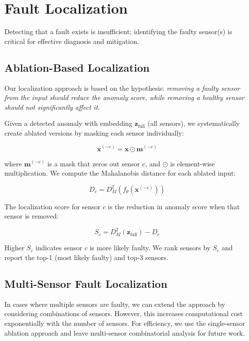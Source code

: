 \section{Fault Localization}

Detecting that a fault exists is insufficient; identifying the faulty sensor(s) is critical for effective diagnosis and mitigation.

\subsection{Ablation-Based Localization}

Our localization approach is based on the hypothesis: \textit{removing a faulty sensor from the input should reduce the anomaly score, while removing a healthy sensor should not significantly affect it}.

Given a detected anomaly with embedding $\mathbf{z}_{\text{full}}$ (all sensors), we systematically create ablated versions by masking each sensor individually:

\begin{equation}
\mathbf{x}^{(-c)} = \mathbf{x} \odot \mathbf{m}^{(-c)}
\end{equation}

where $\mathbf{m}^{(-c)}$ is a mask that zeros out sensor $c$, and $\odot$ is element-wise multiplication. We compute the Mahalanobis distance for each ablated input:

\begin{equation}
D_c = D_M^2(f_\theta(\mathbf{x}^{(-c)}))
\end{equation}

The localization score for sensor $c$ is the reduction in anomaly score when that sensor is removed:

\begin{equation}
S_c = D_M^2(\mathbf{z}_{\text{full}}) - D_c
\end{equation}

Higher $S_c$ indicates sensor $c$ is more likely faulty. We rank sensors by $S_c$ and report the top-1 (most likely faulty) and top-3 sensors.

\subsection{Multi-Sensor Fault Localization}

In cases where multiple sensors are faulty, we can extend the approach by considering combinations of sensors. However, this increases computational cost exponentially with the number of sensors. For efficiency, we use the single-sensor ablation approach and leave multi-sensor combinatorial analysis for future work.

